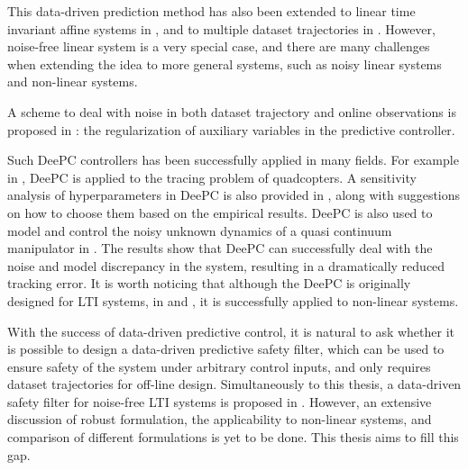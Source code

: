 This data-driven prediction method has also been extended to linear time invariant affine systems in \cite{martinelliDataDrivenAffine2022}, and to multiple dataset trajectories in \cite{vanwaardeMultiple2020}.
However, noise-free linear system is a very special case, and there are many challenges when extending the idea to more general systems, such as noisy linear systems and non-linear systems.

A scheme to deal with noise in both dataset trajectory and online observations is proposed in \cite{coulsonDataenabledPredictiveControl2019}: the regularization of auxiliary variables in the predictive controller.

Such DeePC controllers has been successfully applied in many fields.
For example in \cite{elokdaDataQuad2021}, DeePC is applied to the tracing problem of quadcopters.
A sensitivity analysis of hyperparameters in DeePC is also provided in \cite{elokdaDataQuad2021}, along with suggestions on how to choose them based on the empirical results.
DeePC is also used to model and control the noisy unknown dynamics of a quasi continuum manipulator in \cite{mullerDataDrivenQCR2022}.
The results show that DeePC can successfully deal with the noise and model discrepancy in the system, resulting in a dramatically reduced tracking error.
It is worth noticing that although the DeePC is originally designed for LTI systems, in \cite{elokdaDataQuad2021} and \cite{mullerDataDrivenQCR2022}, it is successfully applied to non-linear systems.

With the success of data-driven predictive control, it is natural to ask whether it is possible to design a data-driven predictive safety filter, which can be used to ensure safety of the system under arbitrary control inputs, and only requires dataset trajectories for off-line design.
Simultaneously to this thesis, a data-driven safety filter for noise-free LTI systems is proposed in \cite{bajelaniDataDrivenSafetyFilter2023}.
However, an extensive discussion of robust formulation, the applicability to non-linear systems, and comparison of different formulations is yet to be done.
This thesis aims to fill this gap.

